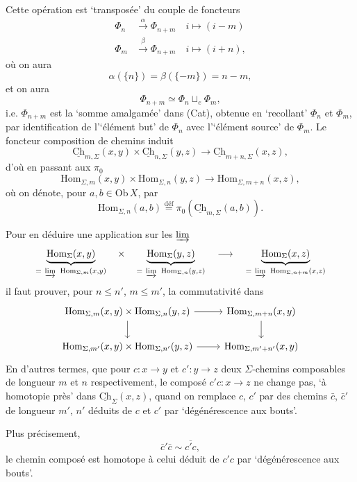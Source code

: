 \documentclass[11pt]{article}
\newcommand{\printedpage}[1]{\marginpar{\footnotesize p.~#1}}
\newcommand{\msp}[1]{\marginpar{\footnotesize [#1]}}
\newcommand{\Hom}{\mathrm{Hom}}
\newcommand{\uCh}{\underline{\mathrm{Ch}}}
\begin{document}
\msp{page 9}
Cette opération est `transposée' du couple de foncteurs
\[
\begin{aligned}
\Phi_n &\xrightarrow{\alpha} \Phi_{n+m}\quad i\longmapsto (i-m)\\
\Phi_m &\xrightarrow{\beta} \Phi_{n+m}\quad i\longmapsto (i+n),
\end{aligned}
\]
\printedpage{7}
où on aura
\[
\alpha(\{n\})=\beta(\{-m\})=n-m,
\]
et on aura
\[
\Phi_{n+m}\simeq\Phi_n\sqcup_e\Phi_m,
\]
i.e. $\Phi_{n+m}$ est la `somme amalgamée' dans (Cat), obtenue en `recollant' $\Phi_n$ et $\Phi_m$, par identification de l'`élément but' de $\Phi_n$ avec l'`élément source' de $\Phi_m$. Le foncteur composition de chemins induit
\[
\uCh_{m,\Sigma}(x,y)\times\uCh_{n,\Sigma}(y,z)\longrightarrow\uCh_{m+n,\Sigma}(x,z),
\]
d'où en passant aux $\pi_0$
\[
\Hom_{\Sigma,m}(x,y)\times\Hom_{\Sigma,n}(y,z)\longrightarrow\Hom_{\Sigma,m+n}(x,z),
\]
où on dénote, pour $a,b\in\mathrm{Ob}\,X$, par
\[
\Hom_{\Sigma,n}(a,b)\overset{\text{déf}}{=}\pi_0(\uCh_{m,\Sigma}(a,b)).
\]



\msp{page 10}
Pour en déduire une application sur les $\varinjlim$
\[
\underbrace{\Hom_\Sigma(x,y)}_{=\ \varinjlim\ \Hom_{\Sigma,m}(x,y)}\quad\times\quad\underbrace{\Hom_\Sigma(y,z)}_{=\ \varinjlim\ \Hom_{\Sigma,n}(y,z)}\quad\longrightarrow\quad\underbrace{\Hom_\Sigma(x,z)}_{=\ \varinjlim\ \Hom_{\Sigma,n+m}(x,z)}
\]
il faut prouver, pour $n\leq n'$, $m\leq m'$, la commutativité dans
\[
\begin{tikzcd}
\Hom_{\Sigma,m}(x,y)\times\Hom_{\Sigma,n}(y,z) \arrow[r] \arrow[d] & \Hom_{\Sigma,m+n}(x,y) \arrow[d] \\
\Hom_{\Sigma,m'}(x,y)\times\Hom_{\Sigma,n'}(y,z) \arrow[r] & \Hom_{\Sigma,m'+n'}(x,y)
\end{tikzcd}
\]
 En d'autres termes, que pour $c:x\longrightarrow y$ et $c':y\longrightarrow z$ deux $\Sigma$-chemins composables de longueur $m$ et $n$ respectivement, le composé $c'c:x\longrightarrow z$ ne change pas, `à homotopie près' dans $\uCh_\Sigma(x,z)$, quand on remplace $c$, $c'$ par des chemins $\bar{c}$, $\bar{c}'$ de longueur $m'$, $n'$ déduits de $c$ et $c'$ par `dégénérescence aux bouts'.

Plus précisement, %
\[
\bar{c}'\bar{c}\sim\overline{c'c},
\]
le chemin composé est homotope à celui déduit de $c'c$ par `dégénérescence aux bouts'.
\end{document}
